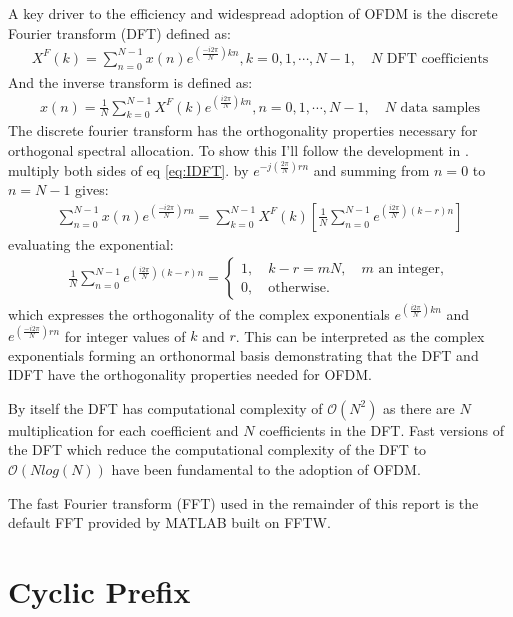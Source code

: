 A key driver to the efficiency and widespread adoption %
of OFDM is the discrete Fourier transform (DFT) defined %
as\cite{Rao2010}:
\begin{align}
	X^F(k) = \sum_{n=0}^{N-1}x(n)e^{(\frac{-i 2\pi}{N})kn}, %
	k=0,1,\cdots,N-1,\quad N \text{ DFT coefficients}
\end{align}
And the inverse transform is defined as:
\begin{align}
	x(n) = \frac{1}{N}\sum_{k=0}^{N-1}X^{F}(k)%
	e^{(\frac{i 2\pi}{N})kn}, n = 0,1,\cdots,N-1, \quad%
	N \text{ data samples}
	\label{eq:IDFT}
\end{align}
The discrete fourier transform has the orthogonality %
properties necessary for orthogonal spectral allocation. %
To show this I'll follow the development in \cite{Opp99}. %
multiply both sides of eq \ref{eq:IDFT}. by %
$e^{-j(\frac{2\pi}{N})rn}$ and summing from $n=0$ %
to $n=N-1$ gives:
\begin{align}
	\sum_{n=0}^{N-1}x(n)e^{(\frac{-i 2\pi}{N})rn} = %
	\sum_{k=0}^{N-1}X^{F}(k)\left[\frac{1}{N} \sum_{n=0}^{N-1} %
	e^{(\frac{i 2\pi}{N})(k-r)n}\right]
\end{align}
evaluating the exponential:
\begin{align}
	\frac{1}{N}\sum_{n=0}^{N-1}e^{(\frac{i 2\pi}{N})(k-r)n}%
	= \begin{cases}
		1,\quad k-r = mN, \quad m\text{ an integer},\\
		0,\quad \text{otherwise.}
	\end{cases}
\end{align}
which expresses the orthogonality of the complex exponentials %
$e^{(\frac{i 2\pi}{N})kn}$ and $e^{(\frac{-i 2\pi}{N})rn}$ for %
integer values of $k$ and $r$. This can be interpreted as the %
complex exponentials forming an orthonormal basis demonstrating %
that %
the DFT and IDFT have the orthogonality properties needed for %
OFDM.

By itself the DFT has computational complexity of $\mathcal{O}(%
N^2)$ as there are $N$ multiplication for each coefficient and %
$N$ coefficients in the DFT. Fast versions of the DFT which %
reduce the computational complexity of the DFT to $\mathcal{O}(%
Nlog(N))$ have been fundamental to the adoption of OFDM.%

The fast Fourier transform (FFT) used in the remainder of %
this report %
is the default FFT provided by MATLAB built on FFTW\cite{FFTW}. %
\section{Cyclic Prefix}

